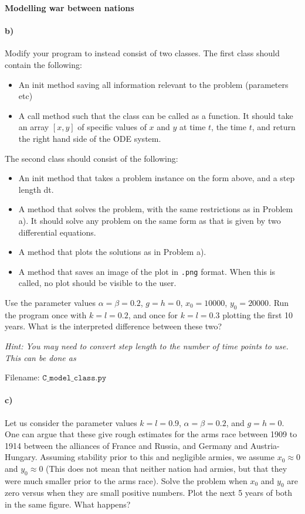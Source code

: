 \begin{Problem}{\textbf{Modelling war between nations}}
\paragraph{b)}
Modify your program to instead consist of two classes. The first class 
should contain the following:
\begin{itemize}
    \item An init method saving all information relevant to the problem (parameters etc)
    \item A call method such that the class can be called as a function. It should
    take an array $[x, y]$ of specific values of $x$ and $y$ at time $t$, the time $t$,
    and return the right hand side of the ODE system.
\end{itemize}
The second class  should consist of the following:
\begin{itemize}
    \item An init method that takes a problem instance on the form above, and a step length
    dt.
    \item A method that solves the problem, with the same restrictions as in Problem a).
            It should solve any problem on the same form as 
            that is given by two differential equations.
    \item A method that plots the solutions as in Problem a).
    \item A method that saves an image of the plot in \texttt{.png} format. When this is called,
    no plot should be visible to the user.
\end{itemize}
Use the parameter values $\alpha=\beta=0.2$, $g=h=0$, $x_0=10000$, $y_0=20000$.
Run the program once with $k=l=0.2$, and once for $k=l=0.3$ plotting the first 10 years.
What is the interpreted difference between these two?

\emph{Hint: You may need to convert step length to the number of time points to use.
This can be done as
}


Filename: $\texttt{C\_model\_class.py}$

\paragraph{c)}
Let us consider the parameter values $k=l=0.9$, $\alpha=\beta=0.2$, and $g=h=0$.
One can argue that these give rough estimates for the arms race between 1909 to 1914
between the alliances of France and Russia, and Germany and Austria-Hungary. %
Assuming stability prior to this and negligible armies, we assume $x_0\approx0$ and $y_0\approx0$
(This does not mean that neither nation had armies, but that they were much smaller
prior to the arms race).
Solve the problem when $x_0$ and $y_0$ are zero versus when they are small positive numbers.
Plot the next 5 years of both in the same figure. What happens?


\end{Problem}
